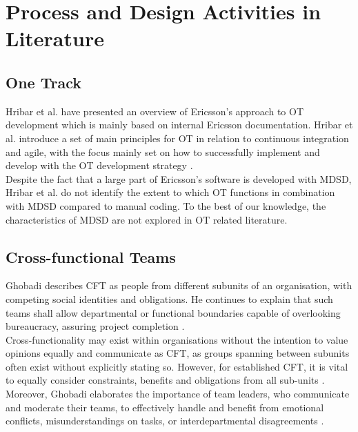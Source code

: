 \documentclass[fina_report_innit.tex]{subfiles}
\begin{document}
\section{Process and Design Activities in Literature}

\subsection{One Track}
Hribar et al. \cite{hribar2008first} have presented an overview of Ericsson's approach to OT development which is mainly based on internal Ericsson documentation. Hribar et al. introduce a set of main principles for OT in relation to continuous integration and agile, with the focus mainly set on how to successfully implement and develop with the OT development strategy \cite{hribar2008first}.
\\

Despite the fact that a large part of Ericsson's software is developed with MDSD, Hribar et al. do not identify the extent to which OT functions in combination with MDSD compared to manual coding. To the best of our knowledge, the characteristics of MDSD are not explored in OT related literature.

\subsection{Cross-functional Teams}
Ghobadi describes CFT as people from different subunits of an organisation, with competing social identities and obligations. He continues to explain that such teams shall allow departmental or functional boundaries capable of overlooking bureaucracy, assuring project completion \cite{ghobadi2011challenges}.
\\

Cross-functionality may exist within organisations without the intention to value opinions equally and communicate as CFT, as groups spanning between subunits often exist without explicitly stating so. However, for established CFT, it is vital to equally consider constraints, benefits and obligations from all sub-units \cite{ghobadi2011challenges}.
\\

Moreover, Ghobadi elaborates the importance of team leaders, who communicate and moderate their teams, to effectively handle and benefit from emotional conflicts, misunderstandings on tasks, or interdepartmental disagreements \cite{ghobadi2011challenges}.
\\
\end{document}
